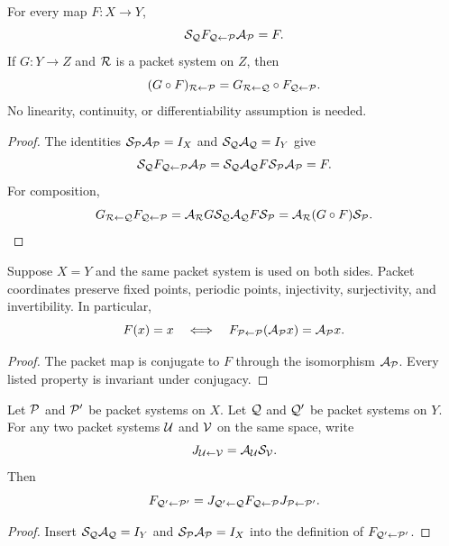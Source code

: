 \begin{theorem}\label{thm:exact_nonlinear_coordinates}
For every map $F:X\to Y$,
\[
\mathcal S_{\mathcal Q}F_{\mathcal Q\leftarrow\mathcal P}\mathcal A_{\mathcal P}=F.
\]
If $G:Y\to Z$ and $\mathcal R$ is a packet system on $Z$, then
\[
(G\circ F)_{\mathcal R\leftarrow\mathcal P}
=
G_{\mathcal R\leftarrow\mathcal Q}
\circ
F_{\mathcal Q\leftarrow\mathcal P}.
\]
No linearity, continuity, or differentiability assumption is needed.
\end{theorem}

\begin{proof}
The identities $\mathcal S_{\mathcal P}\mathcal A_{\mathcal P}=I_X$ and $\mathcal S_{\mathcal Q}\mathcal A_{\mathcal Q}=I_Y$ give
\[
\mathcal S_{\mathcal Q}F_{\mathcal Q\leftarrow\mathcal P}\mathcal A_{\mathcal P}
=
\mathcal S_{\mathcal Q}\mathcal A_{\mathcal Q}F\mathcal S_{\mathcal P}\mathcal A_{\mathcal P}
=F.
\]
For composition,
\[
G_{\mathcal R\leftarrow\mathcal Q}F_{\mathcal Q\leftarrow\mathcal P}
=
\mathcal A_{\mathcal R}G\mathcal S_{\mathcal Q}\mathcal A_{\mathcal Q}F\mathcal S_{\mathcal P}
=
\mathcal A_{\mathcal R}(G\circ F)\mathcal S_{\mathcal P}.
\]
\end{proof}

\begin{corollary}\label{cor:dynamical_equivalence}
Suppose $X=Y$ and the same packet system is used on both sides.  Packet coordinates preserve fixed points, periodic points, injectivity, surjectivity, and invertibility.  In particular,
\[
F(x)=x
\quad\Longleftrightarrow\quad
F_{\mathcal P\leftarrow\mathcal P}(\mathcal A_{\mathcal P}x)=\mathcal A_{\mathcal P}x.
\]
\end{corollary}

\begin{proof}
The packet map is conjugate to $F$ through the isomorphism $\mathcal A_{\mathcal P}$.  Every listed property is invariant under conjugacy.
\end{proof}

\begin{proposition}\label{prop:change_packet_coordinates}
Let $\mathcal P$ and $\mathcal P'$ be packet systems on $X$.  Let $\mathcal Q$ and $\mathcal Q'$ be packet systems on $Y$.  For any two packet systems $\mathcal U$ and $\mathcal V$ on the same space, write
\[
J_{\mathcal U\leftarrow\mathcal V}
=
\mathcal A_{\mathcal U}\mathcal S_{\mathcal V}.
\]
Then
\[
F_{\mathcal Q'\leftarrow\mathcal P'}
=
J_{\mathcal Q'\leftarrow\mathcal Q}
F_{\mathcal Q\leftarrow\mathcal P}
J_{\mathcal P\leftarrow\mathcal P'}.
\]
\end{proposition}

\begin{proof}
Insert $\mathcal S_{\mathcal Q}\mathcal A_{\mathcal Q}=I_Y$ and $\mathcal S_{\mathcal P}\mathcal A_{\mathcal P}=I_X$ into the definition of $F_{\mathcal Q'\leftarrow\mathcal P'}$.
\end{proof}

